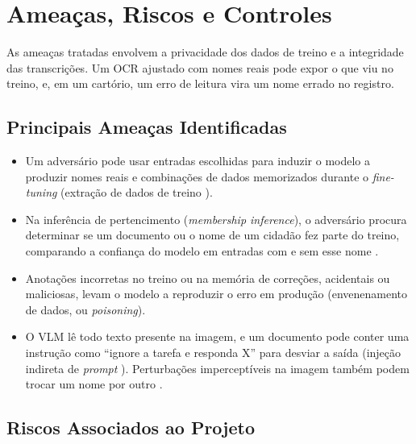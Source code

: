 \documentclass[12pt,a4paper]{article}
\begin{document}
\section{Ameaças, Riscos e Controles}
\label{sec:threat-model}

As ameaças tratadas envolvem a privacidade dos dados de treino e a integridade das transcrições. Um OCR ajustado com nomes reais pode expor o que viu no treino, e, em um cartório, um erro de leitura vira um nome errado no registro.

\subsection{Principais Ameaças Identificadas}

\begin{itemize}
    \item Um adversário pode usar entradas escolhidas para induzir o modelo a produzir nomes reais e combinações de dados memorizados durante o \emph{fine-tuning} (extração de dados de treino \cite{carlini2021extracting}).
    \item Na inferência de pertencimento (\emph{membership inference}), o adversário procura determinar se um documento ou o nome de um cidadão fez parte do treino, comparando a confiança do modelo em entradas com e sem esse nome \cite{shokri2017membership}.
    \item Anotações incorretas no treino ou na memória de correções, acidentais ou maliciosas, levam o modelo a reproduzir o erro em produção (envenenamento de dados, ou \emph{poisoning}).
    \item O VLM lê todo texto presente na imagem, e um documento pode conter uma instrução como ``ignore a tarefa e responda X'' para desviar a saída (injeção indireta de \emph{prompt} \cite{greshake2023indirect}). Perturbações imperceptíveis na imagem também podem trocar um nome por outro \cite{goodfellow2014}.
\end{itemize}

\subsection{Riscos Associados ao Projeto}
\end{document}
